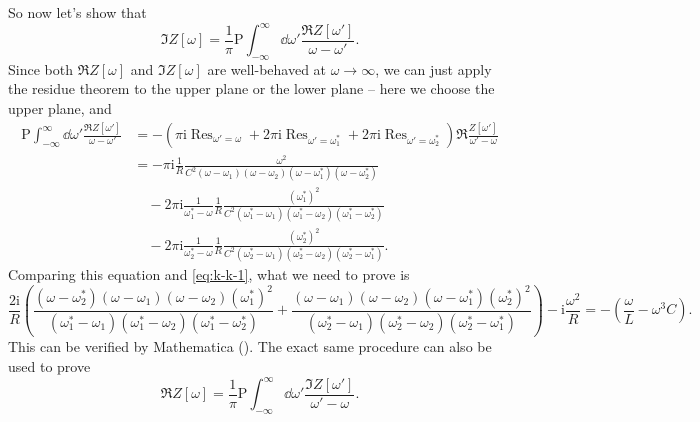 \documentclass[hyperref, a4paper]{article}
\DeclareMathOperator{\res}{Res}
\newcommand*{\ii}{\mathrm{i}}
\begin{document}
So now let's show that 
\begin{equation}
    \Im Z[\omega] = \frac{1}{\pi} \mathrm{P} \int_{-\infty}^\infty \dd{\omega'}
    \frac{\Re Z[\omega']}{\omega - \omega'}.
    \label{eq:k-k-1}
\end{equation}
Since both $\Re Z[\omega]$ and $\Im Z[\omega]$ are well-behaved at $\omega \to \infty$,
we can just apply the residue theorem to the upper plane or the lower plane -- 
here we choose the upper plane, and 
\[
    \begin{aligned}
        \mathrm{P} \int_{-\infty}^\infty \dd{\omega'}
        \frac{\Re Z[\omega']}{\omega - \omega'} &= 
        - (\pi \ii \res_{\omega' = \omega} 
        + 2\pi \ii \res_{\omega' = \omega_1^*} 
        + 2\pi \ii \res_{\omega' = \omega_2^*}) \Re \frac{Z[\omega']}{\omega' - \omega} \\
        &= - \pi \ii \frac{1}{R} \frac{\omega^2}{
            C^2 (\omega - \omega_1) (\omega - \omega_2) (\omega - \omega_1^*) (\omega - \omega_2^*)
        } \\
        &\quad - 2 \pi \ii \frac{1}{\omega_1^* - \omega} \frac{1}{R} \frac{(\omega_1^*)^2}{
            C^2 (\omega_1^* - \omega_1) (\omega_1^* - \omega_2) (\omega_1^* - \omega_2^*)
        } \\
        &\quad - 2 \pi \ii \frac{1}{\omega_2^* - \omega} \frac{1}{R} \frac{(\omega_2^*)^2}{
            C^2 (\omega_2^* - \omega_1) (\omega_2^* - \omega_2) (\omega_2^* - \omega_1^*)
        }.
    \end{aligned}
\]
Comparing this equation and \eqref{eq:k-k-1}, what we need to prove is 
\begin{equation}
    \frac{2\ii}{R} \left(
        \frac{(\omega - \omega_2^*) (\omega - \omega_1) (\omega - \omega_2) (\omega_1^*)^2}{
            (\omega_1^* - \omega_1) (\omega_1^* - \omega_2) (\omega_1^* - \omega_2^*)
        } + 
        \frac{(\omega - \omega_1) (\omega - \omega_2) (\omega - \omega_1^*) (\omega_2^*)^2}{
            (\omega_2^* - \omega_1) (\omega_2^* - \omega_2) (\omega_2^* - \omega_1^*)
        }
    \right) - \ii \frac{\omega^2}{R} = - \left(\frac{\omega}{L} - \omega^3 C \right) .
\end{equation}
This can be verified by Mathematica ().
The exact same procedure can also be used to prove 
\begin{equation}
    \Re Z[\omega] = \frac{1}{\pi} \mathrm{P} \int_{-\infty}^\infty \dd{\omega'}
    \frac{\Im Z[\omega']}{\omega' - \omega}.
    \label{eq:k-k-2}
\end{equation}
\end{document}
